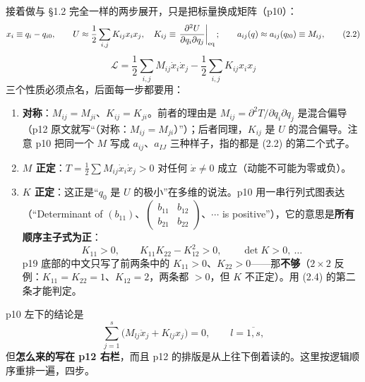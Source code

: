 \documentclass[11pt]{ctexart}
\begin{document}
接着做与 §1.2 完全一样的两步展开，只是把标量换成矩阵（p10）：
\[
x_i\equiv q_i-q_{i0},\qquad
U\approx\frac12\sum_{i,j}K_{ij}x_ix_j,\quad K_{ij}\equiv\left.\frac{\partial^2U}{\partial q_i\partial q_j}\right|_{\rm eq};\qquad
a_{ij}(q)\approx a_{ij}(q_{l0})\equiv M_{ij},
\tag{2.2}
\]
\[
\boxed{\ \mathcal{L}=\frac12\sum_{i,j}M_{ij}\dot x_i\dot x_j-\frac12\sum_{i,j}K_{ij}x_ix_j\ }
\tag{2.3}
\]
三个性质必须点名，后面每一步都要用：

\begin{enumerate}
\item \textbf{对称}：$M_{ij}=M_{ji}$、$K_{ij}=K_{ji}$。前者的理由是 $M_{ij}=\partial^2T/\partial\dot q_i\partial\dot q_j$ 是混合偏导（p12 原文就写“（对称：$M_{ij}=M_{ji}$）”）；后者同理，$K_{ij}$ 是 $U$ 的混合偏导。注意 p10 把同一个 $M$ 写成 $a_{ij}$、$a_{IJ}$ 三种样子，指的都是 (2.2) 的第二个式子。
\item \textbf{$M$ 正定}：$T=\frac12\sum M_{ij}\dot x_i\dot x_j>0$ 对任何 $\dot x\ne0$ 成立（动能不可能为零或负）。
\item \textbf{$K$ 正定}：这正是“$q_0$ 是 $U$ 的极小”在多维的说法。p10 用一串行列式图表达（“Determinant of $(b_{11})$、$\begin{pmatrix}b_{11}&b_{12}\\b_{21}&b_{22}\end{pmatrix}$、$\cdots$ is positive”），它的意思是\textbf{所有顺序主子式为正}：
\[
K_{11}>0,\qquad K_{11}K_{22}-K_{12}^2>0,\qquad\det K>0,\ \dots
\tag{2.4}
\]
p19 底部的中文只写了前两条中的 $K_{11}>0$、$K_{22}>0$——那\textbf{不够}（$2\times2$ 反例：$K_{11}=K_{22}=1$、$K_{12}=2$，两条都 $>0$，但 $K$ 不正定）。用 (2.4) 的第二条才能判定。
\end{enumerate}



p10 左下的结论是
\[
\sum_{j=1}^{s}\bigl(M_{lj}\ddot x_j+K_{lj}x_j\bigr)=0,\qquad l=\overline{1,s},
\tag{2.5}
\]
但\textbf{怎么来的写在 p12 右栏}，而且 p12 的排版是从上往下倒着读的。这里按逻辑顺序重排一遍，四步。
\end{document}
